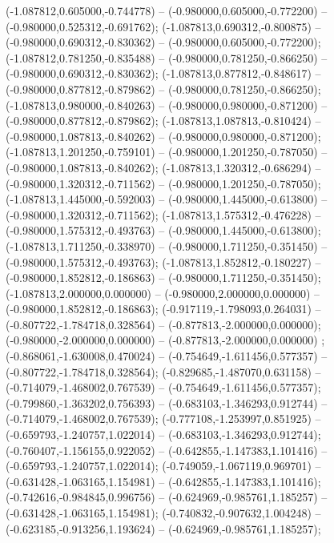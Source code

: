  (-1.087812,0.605000,-0.744778) -- (-0.980000,0.605000,-0.772200) -- (-0.980000,0.525312,-0.691762);
 (-1.087813,0.690312,-0.800875) -- (-0.980000,0.690312,-0.830362) -- (-0.980000,0.605000,-0.772200);
 (-1.087812,0.781250,-0.835488) -- (-0.980000,0.781250,-0.866250) -- (-0.980000,0.690312,-0.830362);
 (-1.087813,0.877812,-0.848617) -- (-0.980000,0.877812,-0.879862) -- (-0.980000,0.781250,-0.866250);
 (-1.087813,0.980000,-0.840263) -- (-0.980000,0.980000,-0.871200) -- (-0.980000,0.877812,-0.879862);
 (-1.087813,1.087813,-0.810424) -- (-0.980000,1.087813,-0.840262) -- (-0.980000,0.980000,-0.871200);
 (-1.087813,1.201250,-0.759101) -- (-0.980000,1.201250,-0.787050) -- (-0.980000,1.087813,-0.840262);
 (-1.087813,1.320312,-0.686294) -- (-0.980000,1.320312,-0.711562) -- (-0.980000,1.201250,-0.787050);
 (-1.087813,1.445000,-0.592003) -- (-0.980000,1.445000,-0.613800) -- (-0.980000,1.320312,-0.711562);
 (-1.087813,1.575312,-0.476228) -- (-0.980000,1.575312,-0.493763) -- (-0.980000,1.445000,-0.613800);
 (-1.087813,1.711250,-0.338970) -- (-0.980000,1.711250,-0.351450) -- (-0.980000,1.575312,-0.493763);
 (-1.087813,1.852812,-0.180227) -- (-0.980000,1.852812,-0.186863) -- (-0.980000,1.711250,-0.351450);
 (-1.087813,2.000000,0.000000) -- (-0.980000,2.000000,0.000000) -- (-0.980000,1.852812,-0.186863);
 (-0.917119,-1.798093,0.264031) -- (-0.807722,-1.784718,0.328564) -- (-0.877813,-2.000000,0.000000);
 (-0.980000,-2.000000,0.000000) -- (-0.877813,-2.000000,0.000000) ;
 (-0.868061,-1.630008,0.470024) -- (-0.754649,-1.611456,0.577357) -- (-0.807722,-1.784718,0.328564);
 (-0.829685,-1.487070,0.631158) -- (-0.714079,-1.468002,0.767539) -- (-0.754649,-1.611456,0.577357);
 (-0.799860,-1.363202,0.756393) -- (-0.683103,-1.346293,0.912744) -- (-0.714079,-1.468002,0.767539);
 (-0.777108,-1.253997,0.851925) -- (-0.659793,-1.240757,1.022014) -- (-0.683103,-1.346293,0.912744);
 (-0.760407,-1.156155,0.922052) -- (-0.642855,-1.147383,1.101416) -- (-0.659793,-1.240757,1.022014);
 (-0.749059,-1.067119,0.969701) -- (-0.631428,-1.063165,1.154981) -- (-0.642855,-1.147383,1.101416);
 (-0.742616,-0.984845,0.996756) -- (-0.624969,-0.985761,1.185257) -- (-0.631428,-1.063165,1.154981);
 (-0.740832,-0.907632,1.004248) -- (-0.623185,-0.913256,1.193624) -- (-0.624969,-0.985761,1.185257);
